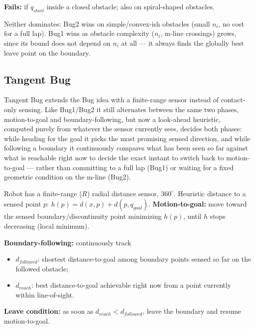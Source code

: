 \textbf{Fails:} if $q_{start}$ inside a closed obstacle; also on spiral-shaped obstacles.
\begin{notebox}
Neither dominates: Bug2 wins on simple/convex-ish obstacles (small $n_i$, no cost for a full lap). Bug1 wins as obstacle complexity ($n_i$, m-line crossings) grows, since its bound does not depend on $n_i$ at all --- it always finds the globally best leave point on the boundary.
\end{notebox}

\begin{democallout}
\end{democallout}

\subsection{Tangent Bug}

Tangent Bug extends the Bug idea with a finite-range sensor instead of contact-only sensing. Like Bug1/Bug2 it still alternates between the same two phases, motion-to-goal and boundary-following, but now a look-ahead heuristic, computed purely from whatever the sensor currently sees, decides both phases: while heading for the goal it picks the most promising sensed direction, and while following a boundary it continuously compares what has been seen so far against what is reachable right now to decide the exact instant to switch back to motion-to-goal --- rather than committing to a full lap (Bug1) or waiting for a fixed geometric condition on the m-line (Bug2).

Robot has a finite-range ($R$) radial distance sensor, $360^\circ$. Heuristic distance to a sensed point $p$: $h(p)=d(x,p)+d(p,q_{goal})$.
\textbf{Motion-to-goal:} move toward the sensed boundary/discontinuity point minimizing $h(p)$, until $h$ stops decreasing (local minimum).


\textbf{Boundary-following:} continuously track
\begin{itemize}
\item $d_{followed}$: shortest distance-to-goal among boundary points sensed so far on the followed obstacle;
\item $d_{reach}$: best distance-to-goal achievable right now from a point currently within line-of-sight.
\end{itemize}
\textbf{Leave condition:} as soon as $d_{reach} < d_{followed}$, leave the boundary and resume motion-to-goal.

